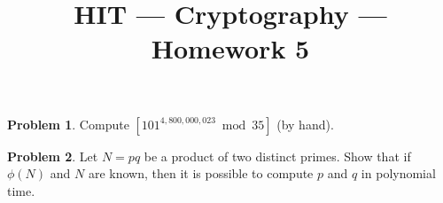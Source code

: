 \documentclass[11pt]{article}
\title{HIT --- Cryptography --- Homework 5}
\theoremstyle{definition}
\newtheorem{problem}{Problem}
\begin{document}
\maketitle


\begin{problem}
Compute $[101^{4,800,000,023} \bmod 35]$ (by hand).
\end{problem}

\begin{problem}
Let $N=pq$ be a product of two distinct primes. Show that if $\phi(N)$ and $N$ are known, then it is possible to compute $p$ and $q$ in polynomial time.
\end{problem}
\end{document}
